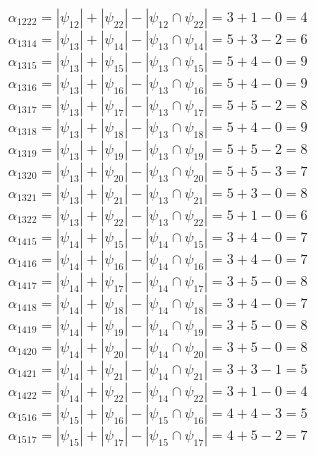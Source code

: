 \documentclass[a4paper,12pt]{article}
\begin{document}
$\alpha_{1222} = |\psi_{12}| + |\psi_{22}| - |\psi_{12} \cap \psi_{22}| = 3 + 1 - 0 = 4$\\
$\alpha_{1314} = |\psi_{13}| + |\psi_{14}| - |\psi_{13} \cap \psi_{14}| = 5 + 3 - 2 = 6$\\
$\alpha_{1315} = |\psi_{13}| + |\psi_{15}| - |\psi_{13} \cap \psi_{15}| = 5 + 4 - 0 = 9$\\
$\alpha_{1316} = |\psi_{13}| + |\psi_{16}| - |\psi_{13} \cap \psi_{16}| = 5 + 4 - 0 = 9$\\
$\alpha_{1317} = |\psi_{13}| + |\psi_{17}| - |\psi_{13} \cap \psi_{17}| = 5 + 5 - 2 = 8$\\
$\alpha_{1318} = |\psi_{13}| + |\psi_{18}| - |\psi_{13} \cap \psi_{18}| = 5 + 4 - 0 = 9$\\
$\alpha_{1319} = |\psi_{13}| + |\psi_{19}| - |\psi_{13} \cap \psi_{19}| = 5 + 5 - 2 = 8$\\
$\alpha_{1320} = |\psi_{13}| + |\psi_{20}| - |\psi_{13} \cap \psi_{20}| = 5 + 5 - 3 = 7$\\
$\alpha_{1321} = |\psi_{13}| + |\psi_{21}| - |\psi_{13} \cap \psi_{21}| = 5 + 3 - 0 = 8$\\
$\alpha_{1322} = |\psi_{13}| + |\psi_{22}| - |\psi_{13} \cap \psi_{22}| = 5 + 1 - 0 = 6$\\
$\alpha_{1415} = |\psi_{14}| + |\psi_{15}| - |\psi_{14} \cap \psi_{15}| = 3 + 4 - 0 = 7$\\
$\alpha_{1416} = |\psi_{14}| + |\psi_{16}| - |\psi_{14} \cap \psi_{16}| = 3 + 4 - 0 = 7$\\
$\alpha_{1417} = |\psi_{14}| + |\psi_{17}| - |\psi_{14} \cap \psi_{17}| = 3 + 5 - 0 = 8$\\
$\alpha_{1418} = |\psi_{14}| + |\psi_{18}| - |\psi_{14} \cap \psi_{18}| = 3 + 4 - 0 = 7$\\
$\alpha_{1419} = |\psi_{14}| + |\psi_{19}| - |\psi_{14} \cap \psi_{19}| = 3 + 5 - 0 = 8$\\
$\alpha_{1420} = |\psi_{14}| + |\psi_{20}| - |\psi_{14} \cap \psi_{20}| = 3 + 5 - 0 = 8$\\
$\alpha_{1421} = |\psi_{14}| + |\psi_{21}| - |\psi_{14} \cap \psi_{21}| = 3 + 3 - 1 = 5$\\
$\alpha_{1422} = |\psi_{14}| + |\psi_{22}| - |\psi_{14} \cap \psi_{22}| = 3 + 1 - 0 = 4$\\
$\alpha_{1516} = |\psi_{15}| + |\psi_{16}| - |\psi_{15} \cap \psi_{16}| = 4 + 4 - 3 = 5$\\
$\alpha_{1517} = |\psi_{15}| + |\psi_{17}| - |\psi_{15} \cap \psi_{17}| = 4 + 5 - 2 = 7$\\
\end{document}
